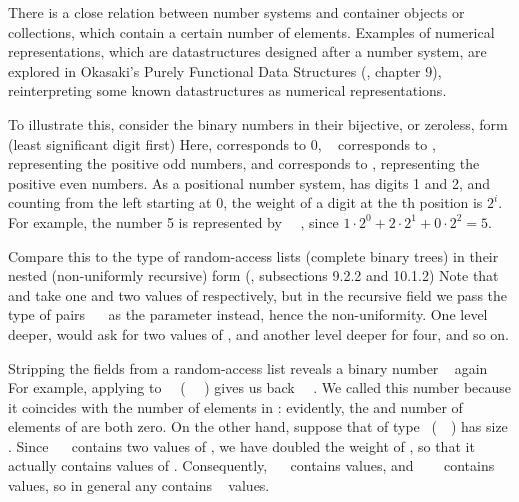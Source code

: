 %

There is a close relation between number systems and container objects or collections, which contain a certain number of elements. Examples of numerical representations, which are datastructures designed after a number system, are explored in Okasaki's Purely Functional Data Structures (\cite{purelyfunctional}, chapter 9), reinterpreting some known datastructures as numerical representations.

To illustrate this, consider the binary numbers in their bijective, or zeroless, form (least significant digit first)
Here,  corresponds to 0, \  corresponds to , representing the positive odd numbers, and  corresponds to , representing the positive even numbers. As a positional number system,  has digits 1 and 2, and counting from the left starting at 0, the weight of a digit at the th position is $2^i$. For example, the number 5 is represented by \ \ , since $1 \cdot 2^0 + 2 \cdot 2^1 + 0 \cdot 2^2 = 5$.

Compare this to the type of random-access lists (complete binary trees) in their nested (non-uniformly recursive) form (\cite{purelyfunctional}, subsections 9.2.2 and 10.1.2)
Note that  and  take one and two values of  respectively, but in the recursive field we pass the type of pairs \ \  as the parameter instead, hence the non-uniformity. One level deeper,  would ask for two values of , and another level deeper for four, and so on.

Stripping the fields from a random-access list  reveals a binary number \  again
For example, applying  to \ \AV{\_}\ (\ \AV{\_}\ \AV{\_} ) gives us back \ \ . We called this number  because it coincides with the number of elements in : evidently, the  and number of elements of  are both zero. On the other hand, suppose that  of type \ (\ \ ) has size . Since \ \  contains two values of , we have doubled the weight of , so that it actually contains  values of . Consequently, \ \  contains  values, and \ \ \  contains  values, so in general any  contains \  values.

